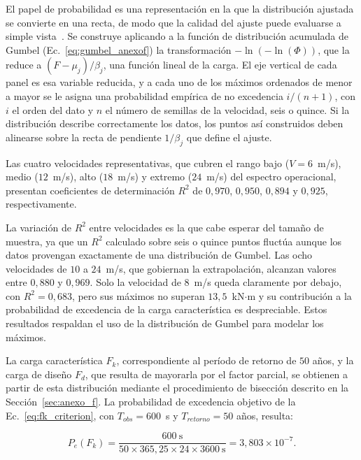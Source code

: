 El papel de probabilidad es una representación en la que la distribución ajustada se convierte en una recta, de modo que la calidad del ajuste puede evaluarse a simple vista~\parencite{Gumbel1958}. Se construye aplicando a la función de distribución acumulada de Gumbel (Ec.~\ref{eq:gumbel_anexof}) la transformación $-\ln(-\ln(\Phi))$, que la reduce a $(F - \mu_j)/\beta_j$, una función lineal de la carga. El eje vertical de cada panel es esa variable reducida, y a cada uno de los máximos ordenados de menor a mayor se le asigna una probabilidad empírica de no excedencia $i/(n+1)$, con $i$ el orden del dato y $n$ el número de semillas de la velocidad, seis o quince. Si la distribución describe correctamente los datos, los puntos así construidos deben alinearse sobre la recta de pendiente $1/\beta_j$ que define el ajuste.

Las cuatro velocidades representativas, que cubren el rango bajo ($V = 6$~m/s), medio ($12$~m/s), alto ($18$~m/s) y extremo ($24$~m/s) del espectro operacional, presentan coeficientes de determinación $R^2$ de $0{,}970$, $0{,}950$, $0{,}894$ y $0{,}925$, respectivamente.

La variación de $R^2$ entre velocidades es la que cabe esperar del tamaño de muestra, ya que un $R^2$ calculado sobre seis o quince puntos fluctúa aunque los datos provengan exactamente de una distribución de Gumbel. Las ocho velocidades de $10$ a $24$~m/s, que gobiernan la extrapolación, alcanzan valores entre $0{,}880$ y $0{,}969$. Solo la velocidad de $8$~m/s queda claramente por debajo, con $R^2 = 0{,}683$, pero sus máximos no superan $13{,}5$~kN$\cdot$m y su contribución a la probabilidad de excedencia de la carga característica es despreciable. Estos resultados respaldan el uso de la distribución de Gumbel para modelar los máximos.

La carga característica $F_k$, correspondiente al período de retorno de $50$ años, y la carga de diseño $F_d$, que resulta de mayorarla por el factor parcial, se obtienen a partir de esta distribución mediante el procedimiento de bisección descrito en la Sección~\ref{sec:anexo_f}. La probabilidad de excedencia objetivo de la Ec.~\ref{eq:fk_criterion}, con $T_{obs} = 600$~s y $T_{retorno} = 50$ años, resulta:

\begin{equation}
    P_e(F_k) = \frac{600\ \text{s}}{50 \times 365{,}25 \times 24 \times 3600\ \text{s}} = 3{,}803 \times 10^{-7}.
    \label{eq:fk_criterion_num}
\end{equation}

